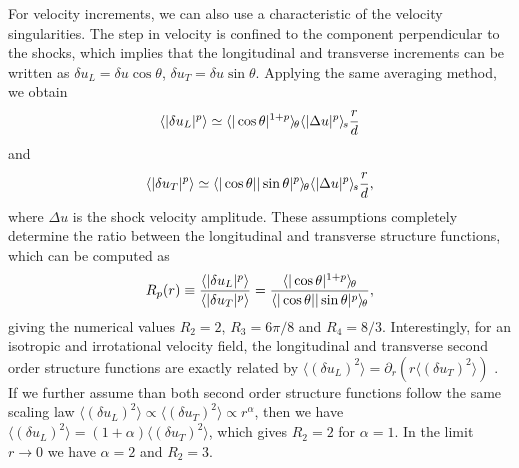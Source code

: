 \documentclass{jfm}
\newcommand\p{\ensuremath{\partial}}
\newcommand{\meane}[1]{\langle #1 \rangle}
\newcommand{\meant}[1]{{\langle #1 \rangle_{\hspace{-0.4mm}\theta}}}
\newcommand{\means}[1]{{\langle #1 \rangle_{\hspace{-0.4mm}s}}}
\begin{document}
For velocity increments, we can also use a characteristic of the
velocity singularities.  The step in velocity is confined to  the component
perpendicular to the shocks, which implies that the longitudinal and
transverse increments can be written as  $\delta u_L = \delta u
\cos\theta$, $\delta u_T = \delta u \sin\theta$.
%
Applying the same averaging method, we obtain
\begin{equation} \label{StepL}
\meane{|\delta u_L|^p} 
\simeq 
\meant{|\cos\theta|^{1+p}}
\means{|\Delta u |^p} \frac{r}{d}
\end{equation}
and
\begin{equation} \label{StepT} 
\meane{|\delta u_T|^p} 
\simeq 
\meant{|\cos\theta||\sin\theta|^{p}}
\means{|\Delta u |^p} \frac{r}{d},
\end{equation}
where $\Delta u $ is the shock velocity amplitude.
%
These assumptions completely determine the ratio between the
longitudinal and transverse structure functions, which can be computed as
\begin{eqnarray} \label{Ratio}
R_p(r) \equiv \frac{\meane{|\delta u_L|^p}}{\meane{|\delta u_T|^p}} = 
\frac{\meant{|\cos\theta|^{1+p}}}{\meant{|\cos\theta||\sin\theta|^p}},
\end{eqnarray}
giving the numerical values $R_2 = 2$, $R_3 = 6\pi/8$ and $R_4 = 8/3$.
Interestingly, for an isotropic and irrotational velocity field, the longitudinal and transverse second order structure functions
are exactly related by $\meane{(\delta u_L)^2} = \p_r( r\meane{(\delta
u_T)^2} )$ \cite[]{Lindborg2007jas}. If we further assume than both second order structure functions follow
the same scaling law $\meane{ (\delta u_L)^2} \propto \meane{ (\delta
u_T)^2} \propto r^\alpha$, then we have $\meane{ (\delta u_L)^2} =
(1+\alpha) \meane{ (\delta u_T)^2} $, which gives $ R_2 = 2 $ for 
$  \alpha = 1$.  In the limit $ r \rightarrow 0 $ we have $ \alpha = 2 $ and $ R_2 = 3 $.
%
\end{document}
